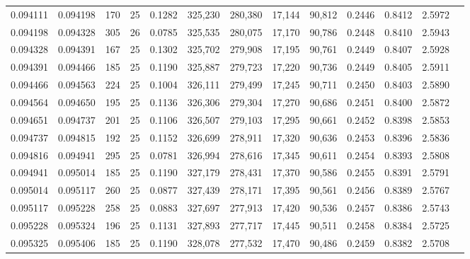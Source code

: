 \begin{tabular}{rrrrrrrrrrrrr}
0.094111 & 0.094198 &   170 &  25 &                                     0.1282 & 325,230 & 280,380 &  17,144 &  90,812 & 0.2446 & 0.8412 & 2.5972 \\
0.094198 & 0.094328 &   305 &  26 &                                     0.0785 & 325,535 & 280,075 &  17,170 &  90,786 & 0.2448 & 0.8410 & 2.5943 \\
0.094328 & 0.094391 &   167 &  25 &                                     0.1302 & 325,702 & 279,908 &  17,195 &  90,761 & 0.2449 & 0.8407 & 2.5928 \\
0.094391 & 0.094466 &   185 &  25 &                                     0.1190 & 325,887 & 279,723 &  17,220 &  90,736 & 0.2449 & 0.8405 & 2.5911 \\
0.094466 & 0.094563 &   224 &  25 &                                     0.1004 & 326,111 & 279,499 &  17,245 &  90,711 & 0.2450 & 0.8403 & 2.5890 \\
0.094564 & 0.094650 &   195 &  25 &                                     0.1136 & 326,306 & 279,304 &  17,270 &  90,686 & 0.2451 & 0.8400 & 2.5872 \\
0.094651 & 0.094737 &   201 &  25 &                                     0.1106 & 326,507 & 279,103 &  17,295 &  90,661 & 0.2452 & 0.8398 & 2.5853 \\
0.094737 & 0.094815 &   192 &  25 &                                     0.1152 & 326,699 & 278,911 &  17,320 &  90,636 & 0.2453 & 0.8396 & 2.5836 \\
0.094816 & 0.094941 &   295 &  25 &                                     0.0781 & 326,994 & 278,616 &  17,345 &  90,611 & 0.2454 & 0.8393 & 2.5808 \\
0.094941 & 0.095014 &   185 &  25 &                                     0.1190 & 327,179 & 278,431 &  17,370 &  90,586 & 0.2455 & 0.8391 & 2.5791 \\
0.095014 & 0.095117 &   260 &  25 &                                     0.0877 & 327,439 & 278,171 &  17,395 &  90,561 & 0.2456 & 0.8389 & 2.5767 \\
0.095117 & 0.095228 &   258 &  25 &                                     0.0883 & 327,697 & 277,913 &  17,420 &  90,536 & 0.2457 & 0.8386 & 2.5743 \\
0.095228 & 0.095324 &   196 &  25 &                                     0.1131 & 327,893 & 277,717 &  17,445 &  90,511 & 0.2458 & 0.8384 & 2.5725 \\
0.095325 & 0.095406 &   185 &  25 &                                     0.1190 & 328,078 & 277,532 &  17,470 &  90,486 & 0.2459 & 0.8382 & 2.5708 \\

\end{tabular}
